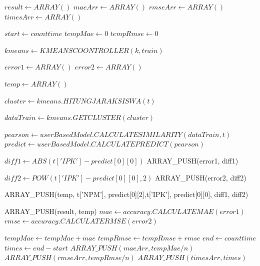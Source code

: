 \begin{algorithm}[H]
  \begin{algorithmic}[1]
       \State $result \gets ARRAY()$
       \State $maeArr \gets ARRAY()$
       \State $rmseArr \gets ARRAY()$
       \State $timesArr \gets ARRAY()$
       
            \State $start \gets count time$
            \State $tempMae \gets 0$
            \State $tempRmse \gets 0$
            
                \State $kmeans \gets KMEANSCOONTROLLER(k, train)$
                
                \State $error1 \gets ARRAY()$
                \State $error2 \gets ARRAY()$
                
                        \State $temp \gets ARRAY()$
                        
                        \State $cluster \gets kmeans.HITUNGJARAKSISWA(t)$
                        
                        \State $dataTrain \gets kmeans.GETCLUSTER(cluster)$
                        
                        \State $pearson \gets userBasedModel.CALCULATESIMILARITY(dataTrain, t)$
                        \State $predict \gets userBasedModel.CALCULATEPREDICT(pearson)$
                        
                            \State $diff1 \gets ABS(t['IPK'] - predict[0][0])$
                            \State ARRAY\_PUSH(error1, diff1)
                            
                            \State $diff2 \gets POW(t['IPK'] - predict[0][0],2)$
                            \State ARRAY\_PUSH(error2, diff2)
                            
                            \State ARRAY\_PUSH(temp, t['NPM'], predict[0][2],t['IPK'], predict[0][0], diff1, diff2)
                            
                            \State ARRAY\_PUSH(result, temp)
                        \EndIf
                    \EndIf
                \EndFor
                    \State $mae \gets accuracy.CALCULATEMAE(error1)$
                    \State $rmse \gets accuracy.CALCULATERMSE(error2)$
                    
                    \State $tempMae \gets tempMae + mae$
                    \State $tempRmse \gets tempRmse + rmse$
            \EndFor
            \State $end \gets count time$
            \State $times \gets end - start$
            \State $ARRAY\_PUSH(maeArr, tempMae/n)$
            \State $ARRAY\_PUSH(rmseArr, tempRmse/n)$
            \State $ARRAY\_PUSH(timesArr, times)$
       \EndFor
       

\end{algorithmic}
\end{algorithm}
